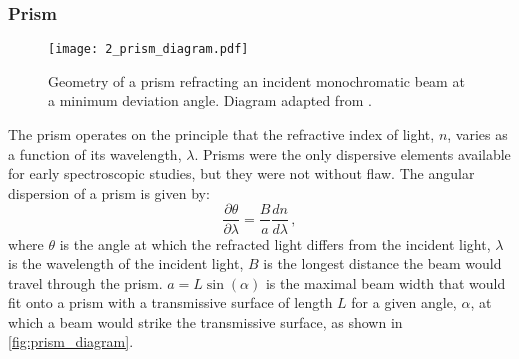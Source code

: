 \subsubsection{Prism} \label{subsubsec:prism}

\begin{figure}[t]
    \centering
    \texttt{[image: 2\_prism\_diagram.pdf]}
    \caption{
        Geometry of a prism refracting an incident monochromatic beam at a minimum deviation angle.
        Diagram adapted from \cite{BirneyObsAstro}.
    }
    \label{fig:prism_diagram}
\end{figure}

The prism operates on the principle that the refractive index of light, $n$, varies as a function of its wavelength, $\lambda$.
Prisms were the only dispersive elements available for early spectroscopic studies, but they were not without flaw.
The angular dispersion of a prism is given by:
\begin{equation} \label{eq:prism_angular_dispersion}
    \frac{\partial \theta}{\partial \lambda} = \frac{B}{a}\frac{dn}{d\lambda}\,,
\end{equation}
where $\theta$ is the angle at which the refracted light differs from the incident light, $\lambda$ is the wavelength of the incident light, $B$ is the longest distance the beam would travel through the prism.
$a = L \sin(\alpha)$ is the maximal beam width that would fit onto a prism with a transmissive surface of length $L$ for a given angle, $\alpha$, at which a beam would strike the transmissive surface, as shown in \autoref{fig:prism_diagram}.

